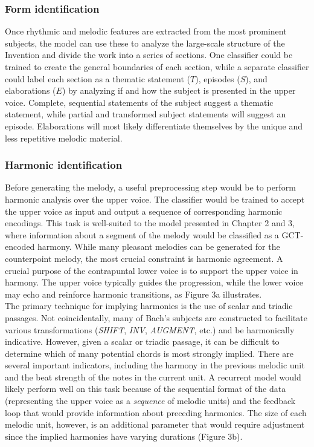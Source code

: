 \documentclass[11pt]{article}
\begin{document}
\subsubsection{Form identification}
Once rhythmic and melodic features are extracted from the most prominent subjects, the model can use these to analyze the large-scale structure of the Invention and divide the work into a series of sections. One classifier could be trained to create the general boundaries of each section, while a separate classifier could label each section as a thematic statement ($T$), episodes ($S$), and elaborations ($E$) by analyzing if and how the subject is presented in the upper voice. Complete, sequential statements of the subject suggest a thematic statement, while partial and transformed subject statements will suggest an episode. Elaborations will most likely differentiate themselves by the unique and less repetitive melodic material.

\subsubsection{Harmonic identification}
Before generating the melody, a useful preprocessing step would be to perform harmonic analysis over the upper voice. The classifier would be trained to accept the upper voice as input and output a sequence of corresponding harmonic encodings. This task is well-suited to the model presented in Chapter 2 and 3, where information about a segment of the melody would be classified as a GCT-encoded harmony. While many pleasant melodies can be generated for the counterpoint melody, the most crucial constraint is harmonic agreement. A crucial purpose of the contrapuntal lower voice is to support the upper voice in harmony. The upper voice typically guides the progression, while the lower voice may echo and reinforce harmonic transitions, as Figure 3a illustrates. \\

The primary technique for implying harmonies is the use of scalar and triadic passages. Not coincidentally, many of Bach's subjects are constructed to facilitate various transformations (\textit{SHIFT}, \textit{INV}, \textit{AUGMENT}, etc.) and be harmonically indicative. However, given a scalar or triadic passage, it can be difficult to determine which of many potential chords is most strongly implied. There are several important indicators, including the harmony in the previous melodic unit and the beat strength of the notes in the current unit. A recurrent model would likely perform well on this task because of the sequential format of the data (representing the upper voice as a \textit{sequence} of melodic units) and the feedback loop that would provide information about preceding harmonies. The size of each melodic unit, however, is an additional parameter that would require adjustment since the implied harmonies have varying durations (Figure 3b). \\
\end{document}
